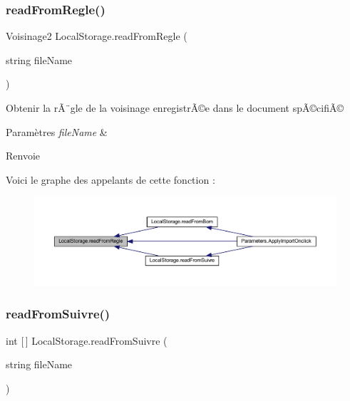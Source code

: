 \subsubsection{\texorpdfstring{read\+From\+Regle()}{readFromRegle()}}
{\footnotesize\ttfamily Voisinage2 Local\+Storage.\+read\+From\+Regle (\begin{DoxyParamCaption}\item[{string}]{file\+Name }\end{DoxyParamCaption})\hspace{0.3cm}{\ttfamily [inline]}}



Obtenir la rÃ¨gle de la voisinage enregistrÃ©e dans le document spÃ©cifiÃ© 


\begin{DoxyParams}{Paramètres}
{\em file\+Name} & \\
\hline
\end{DoxyParams}
\begin{DoxyReturn}{Renvoie}

\end{DoxyReturn}
Voici le graphe des appelants de cette fonction \+:\nopagebreak
\begin{figure}[H]
\begin{center}
\leavevmode
\includegraphics[width=350pt]{class_local_storage_afbd7328c28fa47b11fcc174da3cc8ec1_icgraph}
\end{center}
\end{figure}
\mbox{\label{class_local_storage_a0c0003569be45cff5fda794e42243c1e}} 
\subsubsection{\texorpdfstring{read\+From\+Suivre()}{readFromSuivre()}}
{\footnotesize\ttfamily int \mbox{[}$\,$\mbox{]} Local\+Storage.\+read\+From\+Suivre (\begin{DoxyParamCaption}\item[{string}]{file\+Name }\end{DoxyParamCaption})\hspace{0.3cm}{\ttfamily [inline]}}



